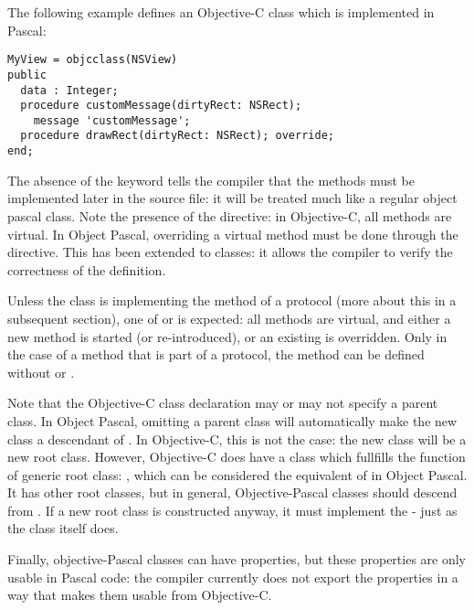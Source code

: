 The following example defines an Objective-C class which is implemented in
Pascal:
\begin{verbatim}
MyView = objcclass(NSView)
public
  data : Integer;
  procedure customMessage(dirtyRect: NSRect); 
    message 'customMessage';
  procedure drawRect(dirtyRect: NSRect); override;
end;
\end{verbatim}
The absence of the  keyword tells the compiler that the
methods must be implemented later in the source file: it will be treated
much like a regular object pascal class. Note the presence of the
 directive: in Objective-C, all methods are virtual. In Object
Pascal, overriding a virtual method must be done through the 
directive. This has been extended to  classes: it allows
the compiler to verify the correctness of the definition.

Unless the class is implementing the method of a protocol (more about this
in a subsequent section), one of  or  is
expected: all methods are virtual, and either a new method is started (or
re-introduced), or an existing is overridden. Only in the case of a method
that is part of a protocol, the method can be defined without 
or .


Note that the Objective-C class declaration may or may not specify a parent class.
In Object Pascal, omitting a parent class will automatically make the
new class a descendant of . In Objective-C, this is not the
case: the new class will be a new root class. However, Objective-C does
have a class which fullfills the function of generic root class:
, which can be considered the equivalent of 
in Object Pascal. It has other root classes, but in general,
Objective-Pascal classes should descend from . If a new
root class is constructed anyway, it must implement the
 - just as the  class itself does.

Finally, objective-Pascal classes can have properties, but these properties
are only usable in Pascal code: the compiler currently does not export the
properties in a way that makes them usable from Objective-C.

